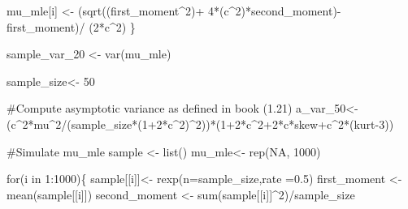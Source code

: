 \documentclass[
  letterpaper,
  DIV=11,
  numbers=noendperiod]{scrreprt}
\newenvironment{Shaded}{\begin{snugshade}}{\end{snugshade}}
\newcommand{\AttributeTok}[1]{\textcolor[rgb]{0.40,0.45,0.13}{#1}}
\newcommand{\CommentTok}[1]{\textcolor[rgb]{0.37,0.37,0.37}{#1}}
\newcommand{\ConstantTok}[1]{\textcolor[rgb]{0.56,0.35,0.01}{#1}}
\newcommand{\ControlFlowTok}[1]{\textcolor[rgb]{0.00,0.23,0.31}{#1}}
\newcommand{\DecValTok}[1]{\textcolor[rgb]{0.68,0.00,0.00}{#1}}
\newcommand{\FloatTok}[1]{\textcolor[rgb]{0.68,0.00,0.00}{#1}}
\newcommand{\FunctionTok}[1]{\textcolor[rgb]{0.28,0.35,0.67}{#1}}
\newcommand{\NormalTok}[1]{\textcolor[rgb]{0.00,0.23,0.31}{#1}}
\newcommand{\OtherTok}[1]{\textcolor[rgb]{0.00,0.23,0.31}{#1}}
\newcommand{\SpecialCharTok}[1]{\textcolor[rgb]{0.37,0.37,0.37}{#1}}
\begin{document}
\begin{Shaded}
\begin{Highlighting}[]
\NormalTok{    mu\_mle[i] }\OtherTok{\textless{}{-}}
\NormalTok{      (}\FunctionTok{sqrt}\NormalTok{((first\_moment}\SpecialCharTok{\^{}}\DecValTok{2}\NormalTok{)}\SpecialCharTok{+}
              \DecValTok{4}\SpecialCharTok{*}\NormalTok{(c}\SpecialCharTok{\^{}}\DecValTok{2}\NormalTok{)}\SpecialCharTok{*}\NormalTok{second\_moment)}\SpecialCharTok{{-}}\NormalTok{ first\_moment)}\SpecialCharTok{/}
\NormalTok{      (}\DecValTok{2}\SpecialCharTok{*}\NormalTok{c}\SpecialCharTok{\^{}}\DecValTok{2}\NormalTok{)}
\NormalTok{\}}

\NormalTok{sample\_var\_20 }\OtherTok{\textless{}{-}} \FunctionTok{var}\NormalTok{(mu\_mle)}

\NormalTok{sample\_size}\OtherTok{\textless{}{-}} \DecValTok{50}

\CommentTok{\#Compute asymptotic variance as defined in book (1.21)}
\NormalTok{a\_var\_50}\OtherTok{\textless{}{-}}\NormalTok{ (c}\SpecialCharTok{\^{}}\DecValTok{2}\SpecialCharTok{*}\NormalTok{mu}\SpecialCharTok{\^{}}\DecValTok{2}\SpecialCharTok{/}\NormalTok{(sample\_size}\SpecialCharTok{*}\NormalTok{(}\DecValTok{1}\SpecialCharTok{+}\DecValTok{2}\SpecialCharTok{*}\NormalTok{c}\SpecialCharTok{\^{}}\DecValTok{2}\NormalTok{)}\SpecialCharTok{\^{}}\DecValTok{2}\NormalTok{))}\SpecialCharTok{*}\NormalTok{(}\DecValTok{1}\SpecialCharTok{+}\DecValTok{2}\SpecialCharTok{*}\NormalTok{c}\SpecialCharTok{\^{}}\DecValTok{2}\SpecialCharTok{+}\DecValTok{2}\SpecialCharTok{*}\NormalTok{c}\SpecialCharTok{*}\NormalTok{skew}\SpecialCharTok{+}\NormalTok{c}\SpecialCharTok{\^{}}\DecValTok{2}\SpecialCharTok{*}\NormalTok{(kurt}\DecValTok{{-}3}\NormalTok{))}

\CommentTok{\#Simulate mu\_mle}
\NormalTok{sample }\OtherTok{\textless{}{-}} \FunctionTok{list}\NormalTok{()}
\NormalTok{mu\_mle}\OtherTok{\textless{}{-}} \FunctionTok{rep}\NormalTok{(}\ConstantTok{NA}\NormalTok{, }\DecValTok{1000}\NormalTok{)}

\ControlFlowTok{for}\NormalTok{(i }\ControlFlowTok{in} \DecValTok{1}\SpecialCharTok{:}\DecValTok{1000}\NormalTok{)\{}
\NormalTok{    sample[[i]]}\OtherTok{\textless{}{-}} \FunctionTok{rexp}\NormalTok{(}\AttributeTok{n=}\NormalTok{sample\_size,}\AttributeTok{rate =}\FloatTok{0.5}\NormalTok{)}
\NormalTok{    first\_moment }\OtherTok{\textless{}{-}} \FunctionTok{mean}\NormalTok{(sample[[i]])}
\NormalTok{    second\_moment }\OtherTok{\textless{}{-}} \FunctionTok{sum}\NormalTok{(sample[[i]]}\SpecialCharTok{\^{}}\DecValTok{2}\NormalTok{)}\SpecialCharTok{/}\NormalTok{sample\_size}
    

\end{Highlighting}
\end{Shaded}
\end{document}
